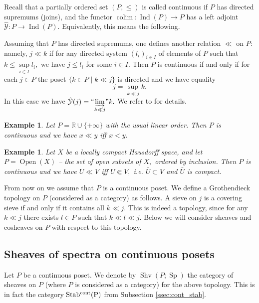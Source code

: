 \documentclass[11pt,leqno]{amsart}
\newtheorem{example}[theo]{Example}
\numberwithin{equation}{section}
\def\R{\mathbb{R}}
\DeclareMathOperator*{\colim}{colim}
\newcommand{\indlim}[1][]{\mathop{\varinjlim}\limits_{#1}}
\newcommand{\inddlim}[1][]{{``{\indlim[#1]}"}}
\newcommand{\cont}{\operatorname{cont}}
\newcommand{\cY}{{\mathcal Y}}
\newcommand{\Sh}{\operatorname{Shv}}
\newcommand{\Sp}{\operatorname{Sp}}
\newcommand{\Ind}{\operatorname{Ind}}
\newcommand{\Stab}{\rm Stab}
\newcommand{\Open}{\operatorname{Open}}
\begin{document}
Recall that a partially ordered set $(P,\leq)$ is called continuous if $P$ has directed supremums (joins), and the functor $\colim:\Ind(P)\to P$ has a left adjoint $\hat{\cY}:P\to\Ind(P).$ Equivalently, this means the following.

Assuming that $P$ has directed supremums, one defines another relation $\ll$ on $P:$ namely, $j\ll k$ if for any directed system $(l_i)_{i\in I}$ of elements of $P$ such that $k\leq \sup\limits_{i\in I}l_i,$ we have $j\leq l_i$ for some $i\in I.$ Then $P$ is continuous if and only if for each $j\in P$ the poset $\{k\in P\mid k\ll j\}$ is directed and we have equality $$j=\sup\limits_{k\ll j}k.$$ In this case we have $\hat{\cY}(j)=\inddlim[k\ll j]k.$ We refer to \cite{GHKLMS, BH81} for details.

\begin{example} Let $P=\R\cup\{+\infty\}$ with the usual linear order. Then $P$ is continuous and we have $x\ll y$ iff $x<y.$\end{example}

\begin{example}\label{ex:Open_X_cont_poset} Let $X$ be a locally compact Hausdorff space, and let $P=\Open(X)$ -- the set of open subsets of $X,$ ordered by inclusion. Then $P$ is continuous and we have $U\ll V$ iff $U\Subset V,$ i.e. $\bar{U}\subset V$ and $\bar{U}$ is compact.\end{example}

From now on we assume that $P$ is a continuous poset. We define a Grothendieck topology on $P$ (considered as a category) as follows. A sieve on $j$ is a covering sieve if and only if it contains all $k\ll j.$ This is indeed a topology, since for any $k\ll j$ there exists $l\in P$ such that $k\ll l \ll j.$ Below we will consider sheaves and cosheaves on $P$ with respect to this topology. 

\subsection{Sheaves of spectra on continuous posets}
\label{ssec:sh_of_sp_on_cont_posets}

Let $P$ be a continuous poset. We denote by $\Sh(P;\Sp)$ the category of sheaves on $P$ (where $P$ is considered as a category) for the above topology. This is in fact the category $\Stab^{\cont}(P)$ from Subsection \ref{ssec:cont_stab}.
\end{document}
